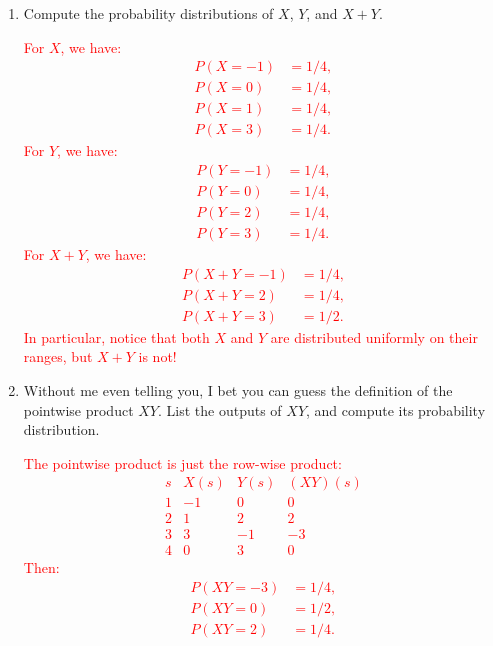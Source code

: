 \documentclass[12pt,reqno]{amsart}
\begin{document}
\medskip
\begin{enumerate}
    \item Compute the probability distributions of $X$, $Y$, and $X+Y$.

    \bigskip
    \textcolor{red}{
        For $X$, we have:
        \begin{align*}
        P(X=-1) &= 1/4, \\
        P(X=0) &= 1/4, \\
        P(X=1) &= 1/4, \\
        P(X=3) &= 1/4.
        \end{align*}
        For $Y$, we have:
        \begin{align*}
        P(Y = -1) &= 1/4, \\
        P(Y = 0) &= 1/4, \\
        P(Y = 2) &= 1/4, \\
        P(Y=3) &= 1/4.
        \end{align*}
        For $X+Y$, we have:
        \begin{align*}
        P(X+Y = -1) &= 1/4, \\
        P(X+Y = 2) &= 1/4, \\
        P(X+Y = 3) &= 1/2.
        \end{align*}
    In particular, notice that both $X$ and $Y$ are distributed uniformly on their ranges, but $X+Y$ is not!}
    \bigskip

    \item Without me even telling you, I bet you can guess the definition of the pointwise product $XY$. List the outputs of $XY$, and compute its probability distribution.
    
    \bigskip
    \textcolor{red}{The pointwise product is just the row-wise product:
        \[
        \begin{array}{c|ccc}
        s & X(s) & Y(s) & (XY)(s) \\ \hline
        1 & -1 & 0 & 0 \\
        2 & 1 & 2 & 2 \\
        3 & 3 & -1 & -3 \\
        4 & 0 & 3 & 0
        \end{array}
        \]
    Then:
        \begin{align*}
        P(XY = -3) &= 1/4, \\
        P(XY = 0) &= 1/2, \\
        P(XY = 2) &= 1/4.
        \end{align*}}
\end{enumerate}
    
\end{document}
